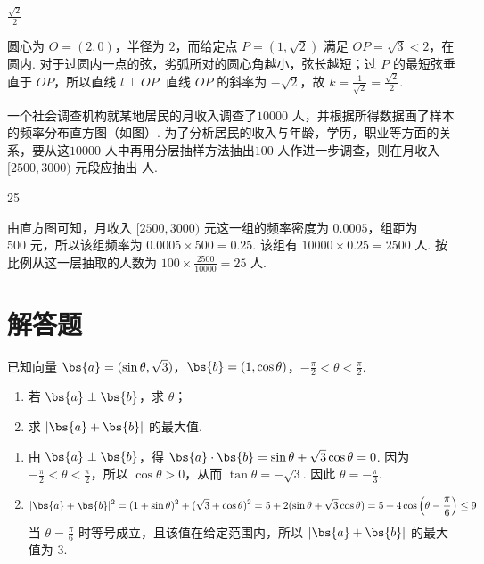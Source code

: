 \begin{answer}
\(\frac{\sqrt{2}}{2}\)
\end{answer}

\begin{solution}
圆心为 \(O=(2,0)\)，半径为 \(2\)，而给定点 \(P=(1,\sqrt2)\) 满足 \(OP=\sqrt3<2\)，在圆内. 对于过圆内一点的弦，劣弧所对的圆心角越小，弦长越短；过 \(P\) 的最短弦垂直于 \(OP\)，所以直线 \(l\perp OP\). 直线 \(OP\) 的斜率为 \(-\sqrt2\)，故 \(k=\frac{1}{\sqrt2}=\frac{\sqrt2}{2}\).
\end{solution}

\begin{problem}
一个社会调查机构就某地居民的月收入调查了\(10000\text{ 人}\)，并根据所得数据画了样本的频率分布直方图（如图）. 为了分析居民的收入与年龄，学历，职业等方面的关系，要从这\(10000\text{ 人}\)中再用分层抽样方法抽出\(100\text{ 人}\)作进一步调查，则在月收入\([2500, 3000)\text{ 元}\)段应抽出\fillinblank{}\(\text{ 人}\).

\end{problem}

\begin{answer}
25
\end{answer}

\begin{solution}
由直方图可知，月收入 \([2500,3000)\) 元这一组的频率密度为 \(0.0005\)，组距为 \(500\text{ 元}\)，所以该组频率为 \(0.0005\times500=0.25\). 该组有 \(10000\times0.25=2500\text{ 人}\). 按比例从这一层抽取的人数为 \(100\times\frac{2500}{10000}=25\text{ 人}\).
\end{solution}

\section{解答题}
\begin{problem}
已知向量 \(\bs{a} = (\sin \theta, \sqrt{3})\)，\(\bs{b} = (1, \cos \theta)\)，\(-\frac{\pi}{2} < \theta < \frac{\pi}{2}\).

\begin{enumerate}
\item 若 \(\bs{a} \perp \bs{b}\)，求 \(\theta\)；
\item 求 \(|\bs{a} + \bs{b}|\) 的最大值.
\end{enumerate}
\end{problem}

\begin{solution}
\begin{enumerate}
\item 由 \(\bs{a}\perp\bs{b}\)，得 \(\bs{a}\cdot\bs{b}=\sin\theta+\sqrt3\cos\theta=0\). 因为 \(-\frac\pi2<\theta<\frac\pi2\)，所以 \(\cos\theta>0\)，从而 \(\tan\theta=-\sqrt3\). 因此 \(\theta=-\frac\pi3\).
\item
\[
\lvert\bs{a}+\bs{b}\rvert^2=(1+\sin\theta)^2+(\sqrt3+\cos\theta)^2=5+2(\sin\theta+\sqrt3\cos\theta)=5+4\cos\left(\theta-\frac\pi6\right)\leq 9
\]
当 \(\theta=\frac\pi6\) 时等号成立，且该值在给定范围内，所以 \(|\bs{a}+\bs{b}|\) 的最大值为 \(3\).
\end{enumerate}
\end{solution}

